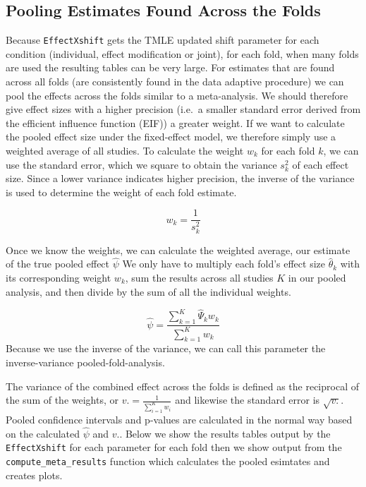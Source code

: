 \documentclass[
]{article}
\begin{document}
\hypertarget{pooling-estimates-found-across-the-folds}{%
\subsection{Pooling Estimates Found Across the
Folds}\label{pooling-estimates-found-across-the-folds}}

Because \texttt{EffectXshift} gets the TMLE updated shift parameter for
each condition (individual, effect modification or joint), for each
fold, when many folds are used the resulting tables can be very large.
For estimates that are found across all folds (are consistently found in
the data adaptive procedure) we can pool the effects across the folds
similar to a meta-analysis. We should therefore give effect sizes with a
higher precision (i.e.~a smaller standard error derived from the
efficient influence function (EIF)) a greater weight. If we want to
calculate the pooled effect size under the fixed-effect model, we
therefore simply use a weighted average of all studies. To calculate the
weight \(w_k\) for each fold \(k\), we can use the standard error, which
we square to obtain the variance \(s^2_k\) of each effect size. Since a
lower variance indicates higher precision, the inverse of the variance
is used to determine the weight of each fold estimate.

\[w_k = \frac{1}{s^2_k}\]

Once we know the weights, we can calculate the weighted average, our
estimate of the true pooled effect \(\hat{\psi}\) We only have to
multiply each fold's effect size \(\hat{\theta}_k\) with its
corresponding weight \(w_k\), sum the results across all studies \(K\)
in our pooled analysis, and then divide by the sum of all the individual
weights.

\[\hat{\psi} = \frac{\sum_{k = 1}^K \hat{\Psi}_k w_k}{\sum_{k = 1}^K w_k}\]
Because we use the inverse of the variance, we can call this parameter
the inverse-variance pooled-fold-analysis.

The variance of the combined effect across the folds is defined as the
reciprocal of the sum of the weights, or
\(v. = \frac{1}{\sum_{i=1}^K w_i}\) and likewise the standard error is
\(\sqrt{v.}\). Pooled confidence intervals and p-values are calculated
in the normal way based on the calculated \(\hat{\psi}\) and \(v.\).
Below we show the results tables output by the \texttt{EffectXshift} for
each parameter for each fold then we show output from the
\texttt{compute\_meta\_results} function which calculates the pooled
esimtates and creates plots.
\end{document}

